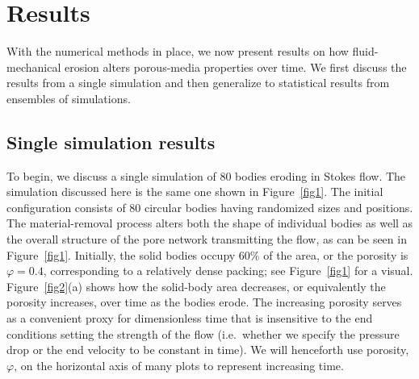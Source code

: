 \documentclass[3p]{elsarticle}
\begin{document}
\section{Results}
\label{sec:results}

With the numerical methods in place, we now present results on how fluid-mechanical erosion alters porous-media properties over time. We first discuss the results from a single simulation and then generalize to statistical results from ensembles of simulations.  

\subsection{Single simulation results}
\label{sec:single_sim}

To begin, we discuss a single simulation of 80 bodies eroding in Stokes flow. The simulation discussed here is the same one shown in Figure~\ref{fig1}. The initial configuration consists of 80 circular bodies having randomized sizes and positions. The material-removal process alters both the shape of individual bodies as well as the overall structure of the pore network transmitting the flow, as can be seen in Figure~\ref{fig1}. Initially, the solid bodies occupy $60\%$ of the area, or the porosity is $\varphi = 0.4$, corresponding to a relatively dense packing; see Figure~\ref{fig1} for a visual. Figure~\ref{fig2}(a) shows how the solid-body area decreases, or equivalently the porosity increases, over time as the bodies erode. The increasing porosity serves as a convenient proxy for dimensionless time that is insensitive to the end conditions setting the strength of the flow (i.e.~whether we specify the pressure drop or the end velocity to be constant in time). We will henceforth use porosity, $\varphi$, on the horizontal axis of many plots to represent increasing time.
\end{document}
